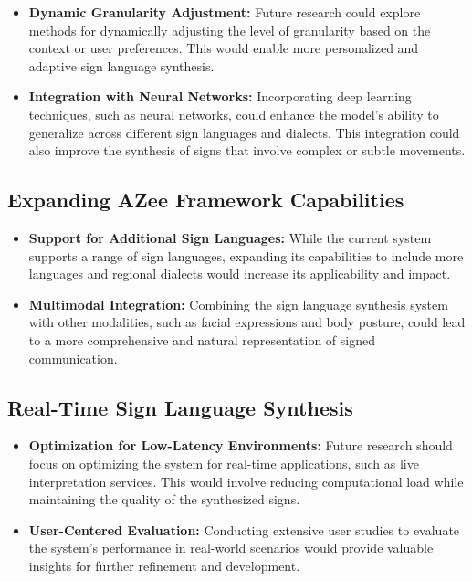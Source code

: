 \documentclass[../../main.tex]{subfiles}
\begin{document}
\begin{itemize}
    \item \textbf{Dynamic Granularity Adjustment:} Future research could explore methods for dynamically adjusting the level of granularity based on the context or user preferences. This would enable more personalized and adaptive sign language synthesis.
    
    \item \textbf{Integration with Neural Networks:} Incorporating deep learning techniques, such as neural networks, could enhance the model’s ability to generalize across different sign languages and dialects. This integration could also improve the synthesis of signs that involve complex or subtle movements.
\end{itemize}

\subsection{Expanding AZee Framework Capabilities}

\begin{itemize}
    \item \textbf{Support for Additional Sign Languages:} While the current system supports a range of sign languages, expanding its capabilities to include more languages and regional dialects would increase its applicability and impact.
    
    \item \textbf{Multimodal Integration:} Combining the sign language synthesis system with other modalities, such as facial expressions and body posture, could lead to a more comprehensive and natural representation of signed communication.
\end{itemize}

\subsection{Real-Time Sign Language Synthesis}

\begin{itemize}
    \item \textbf{Optimization for Low-Latency Environments:} Future research should focus on optimizing the system for real-time applications, such as live interpretation services. This would involve reducing computational load while maintaining the quality of the synthesized signs.
    
    \item \textbf{User-Centered Evaluation:} Conducting extensive user studies to evaluate the system’s performance in real-world scenarios would provide valuable insights for further refinement and development.
\end{itemize}
\end{document}

